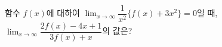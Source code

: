 함수 $f(x)$에 대하여 $\displaystyle\lim_{x\to\infty}\dfrac{1}{x^2}\{f(x)+3x^2\}=0$일 때, $\displaystyle\lim_{x\to\infty}\dfrac{2f(x)-4x+1}{3f(x)+x}$의 값은?
